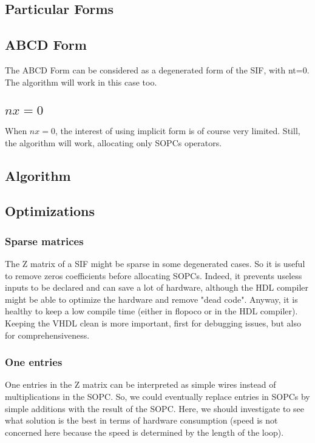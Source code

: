 \subsection{Particular Forms}
	\subsection{ABCD Form}
	The ABCD Form can be considered as a degenerated form of the SIF, with nt=0.
	The algorithm will work in this case too.
	\subsection{$nx=0$}
	When $nx=0$, the interest of using implicit form is of course very limited.
	Still, the algorithm will work, allocating only SOPCs operators.
	
\subsection{Algorithm}

\subsection{Optimizations}
	\subsubsection{Sparse matrices}
		The Z matrix of a SIF might be sparse in some degenerated cases.
		So it is useful to remove zeros coefficients before allocating SOPCs.
		Indeed, it prevents useless inputs to be declared and can save a lot of hardware,
		although the HDL compiler might be able to optimize the hardware and remove "dead code".
		Anyway, it is healthy to keep a low compile time (either in flopoco or in the HDL compiler).
		Keeping the VHDL clean is more important, first for debugging issues, but also for comprehensiveness.
	\subsubsection{One entries}
		One entries in the Z matrix can be interpreted as simple wires instead of multiplications in the SOPC.
		So, we could eventually replace entries in SOPCs by simple additions with the result of the SOPC.
		Here, we should investigate to see what solution is the best in terms of hardware consumption
		(speed is not concerned here because the speed is determined by the length of the loop).


